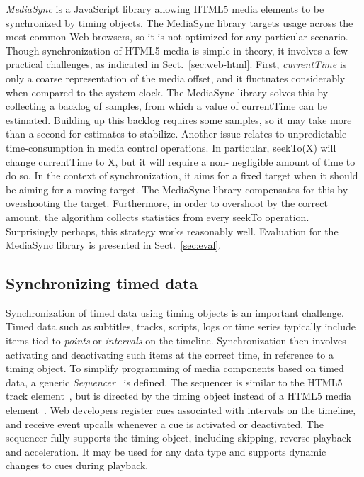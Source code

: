 \emph{MediaSync} is a JavaScript library allowing HTML5 media elements to be
synchronized by timing objects. The MediaSync library targets usage across the
most common Web browsers, so it is not optimized for any particular scenario.
Though synchronization of HTML5 media is simple in theory, it involves a few
practical challenges, as indicated in Sect.~\ref{sec:web-html}. First,
\emph{currentTime} is only a coarse representation of the media offset, and it
fluctuates considerably when compared to the system clock. The MediaSync
library solves this by collecting a backlog of samples, from which a value of
currentTime can be estimated. Building up this backlog requires some samples,
so it may take more than a second for estimates to stabilize. Another issue
relates to unpredictable time-consumption in media control operations. In
particular, seekTo(X) will change currentTime to X, but it will require a non-
negligible amount of time to do so. In the context of synchronization, it aims
for a fixed target when it should be aiming for a moving target. The MediaSync
library compensates for this by overshooting the target. Furthermore, in order
to overshoot by the correct amount, the algorithm collects statistics from
every seekTo operation. Surprisingly perhaps, this strategy works reasonably
well. Evaluation for the MediaSync library is presented in Sect.~\ref{sec:eval}.


\subsection{Synchronizing timed data}
\label{sec:sequencer}

Synchronization of timed data using timing objects is an important challenge.
Timed data such as subtitles, tracks, scripts, logs or time series typically
include items tied to \emph{points} or \emph{intervals} on the timeline.
Synchronization then involves activating and deactivating such items at the
correct time, in reference to a timing object. To simplify programming of
media components based on timed data, a generic
\emph{Sequencer}~\cite{sequencer} is defined. The sequencer is similar to the
HTML5 track element~\cite{html5track}, but is directed by the timing object
instead of a HTML5 media element~\cite{html5media}. Web developers register cues associated with
intervals on the timeline, and receive event upcalls whenever a cue is
activated or deactivated. The sequencer fully supports the timing object,
including skipping, reverse playback and acceleration. It may be used for any
data type and supports dynamic changes to cues during playback.

